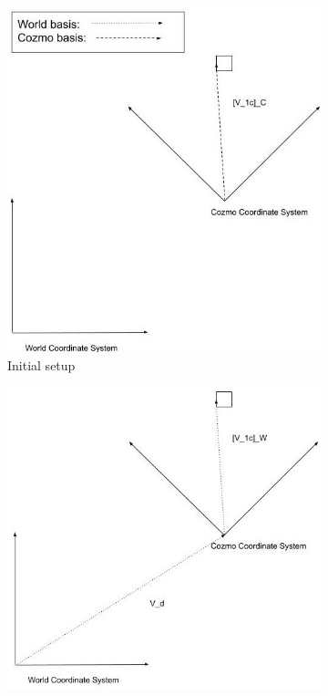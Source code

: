 \documentclass[jou,apacite]{apa6}
\begin{document}
\begin{figure}[h!]
	\centering
	\begin{subfigure}[b]{0.5\linewidth}
		\includegraphics[width=\linewidth]{cw1.jpg}
		\caption{Initial setup}
	\end{subfigure}
	\begin{subfigure}[b]{0.5\linewidth}
		\includegraphics[width=\linewidth]{cw2.jpg}

\end{subfigure}
\end{figure}
\end{document}

